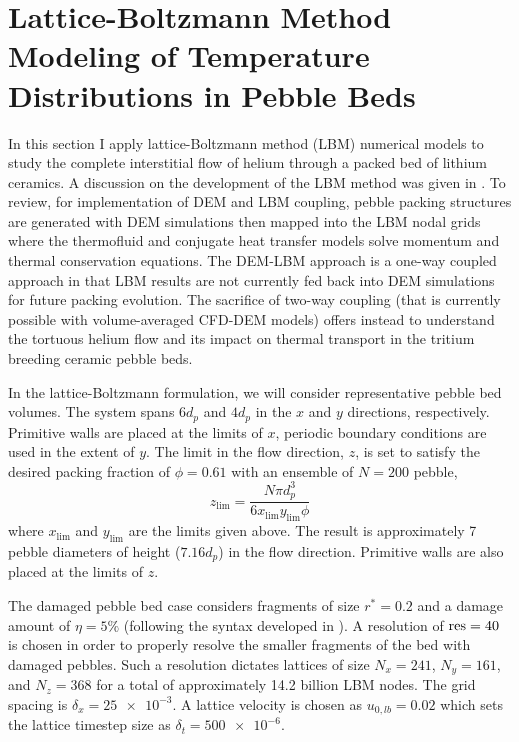 \section{Lattice-Boltzmann Method Modeling of Temperature Distributions in Pebble Beds}\label{sec:lbm-studies}
In this section I apply lattice-Boltzmann method (LBM) numerical models to study the complete interstitial flow of helium through a packed bed of lithium ceramics. A discussion on the development of the LBM method was given in . To review, for implementation of DEM and LBM coupling, pebble packing structures are generated with DEM simulations then mapped into the LBM nodal grids where the thermofluid and conjugate heat transfer models solve momentum and thermal conservation equations. The DEM-LBM approach is a one-way coupled approach in that LBM results are not currently fed back into DEM simulations for future packing evolution. The sacrifice of two-way coupling (that is currently possible with volume-averaged CFD-DEM models) offers instead to understand the tortuous helium flow and its impact on thermal transport in the tritium breeding ceramic pebble beds.

In the lattice-Boltzmann formulation, we will consider representative pebble bed volumes. The system spans $6d_p$ and $4d_p$ in the $x$ and $y$ directions, respectively. Primitive walls are placed at the limits of $x$, periodic boundary conditions are used in the extent of $y$. The limit in the flow direction, $z$, is set to satisfy the desired packing fraction of $\phi = 0.61$ with an ensemble of $N = 200$ pebble,
\begin{equation}
z_\text{lim} = \frac{N\pi d_p^3}{6x_\text{lim}y_\text{lim}\phi}
\end{equation}
where $x_\text{lim}$ and $y_\text{lim}$ are the limits given above. The result is approximately 7 pebble diameters of height ($7.16 d_p$) in the flow direction. Primitive walls are also placed at the limits of $z$.

The damaged pebble bed case considers fragments of size $r^* = 0.2$ and a damage amount of $\eta = 5\%$ (following the syntax developed in ). A resolution of $\text{res} = 40$ is chosen in order to properly resolve the smaller fragments of the bed with damaged pebbles. Such a resolution dictates lattices of size $N_x = 241$, $N_y = 161$, and $N_z = 368$ for a total of approximately 14.2 billion LBM nodes. The grid spacing is $\delta_x = \num{25e-3}$. A lattice velocity is chosen as $u_{0,lb} = 0.02$ which sets the lattice timestep size as $\delta_t = \num{500e-6}$. 

